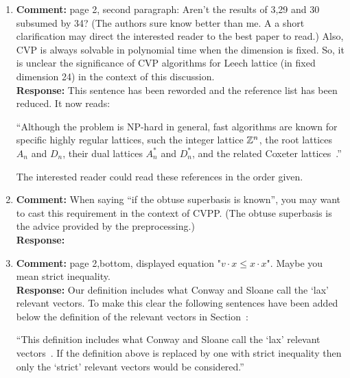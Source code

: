 \documentclass[a4paper,10pt]{article}
\begin{document}
\begin{enumerate}
\item\textbf{Comment:}  
page 2, second paragraph: Aren't the results of 3,29 and 30 subsumed by 34? (The authors sure know better than me. A a short clarification may direct the interested reader to the best paper to read.) Also, CVP is always solvable in polynomial time when the dimension is fixed. So, it is unclear the significance of CVP algorithms for Leech lattice (in fixed dimension 24) in the context of this discussion. 
\\\textbf{Response:}
This sentence has been reworded and the reference list has been reduced.  It now reads:

``Although the problem is NP-hard in general, fast algorithms are known for specific highly regular lattices, such the integer lattice ${\mathbb Z}^{n}$, the root lattices $A_n$ and $D_n$, their dual lattices $A_n^*$ and $D_n^*$, and the related Coxeter lattices~\cite[Chap.~4]{SPLAG}\cite{Conway1982FastQuantDec, McKilliam2008, McKilliam2009CoxeterLattices}.''

The interested reader could read these references in the order given. %

\item\textbf{Comment:}  
When saying ``if the obtuse superbasis is known'', you may want to cast this requirement in the context of CVPP. (The obtuse superbasis is the advice provided by the preprocessing.) 
\\\textbf{Response:}


\item\textbf{Comment:}  
page 2,bottom, displayed equation "$v \cdot x \leq x \cdot x$". Maybe you mean strict inequality.
\\\textbf{Response:}
Our definition includes what Conway and Sloane call the `lax' relevant vectors.  To make this clear the following sentences have been added below the definition of the relevant vectors in Section~:

``This definition includes what Conway and Sloane call the `lax' relevant vectors~\cite{ConwaySloane1992_voronoi_lattice_3d_obtuse_superbases}.  If the definition above is replaced by one with strict inequality then only the `strict' relevant vectors would be considered.'' %


\end{enumerate}
\end{document}
